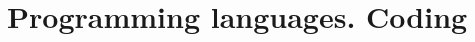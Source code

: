 \documentclass[aspectratio=1610]{beamer}
\begin{document}


    
    








\section{Programming languages. Coding}
\end{document}
